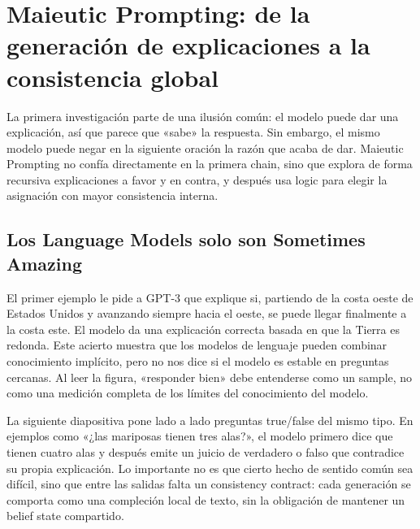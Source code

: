 \section{Maieutic Prompting: de la generación de explicaciones a la consistencia global}

La primera investigación parte de una ilusión común: el modelo puede dar una explicación, así que parece que «sabe» la respuesta. Sin embargo, el mismo modelo puede negar en la siguiente oración la razón que acaba de dar. Maieutic Prompting no confía directamente en la primera chain, sino que explora de forma recursiva explicaciones a favor y en contra, y después usa logic para elegir la asignación con mayor consistencia interna.

\subsection{Los Language Models solo son Sometimes Amazing}

El primer ejemplo le pide a GPT-3 que explique si, partiendo de la costa oeste de Estados Unidos y avanzando siempre hacia el oeste, se puede llegar finalmente a la costa este. El modelo da una explicación correcta basada en que la Tierra es redonda. Este acierto muestra que los modelos de lenguaje pueden combinar conocimiento implícito, pero no nos dice si el modelo es estable en preguntas cercanas. Al leer la figura, «responder bien» debe entenderse como un sample, no como una medición completa de los límites del conocimiento del modelo.


La siguiente diapositiva pone lado a lado preguntas true/false del mismo tipo. En ejemplos como «¿las mariposas tienen tres alas?», el modelo primero dice que tienen cuatro alas y después emite un juicio de verdadero o falso que contradice su propia explicación. Lo importante no es que cierto hecho de sentido común sea difícil, sino que entre las salidas falta un consistency contract: cada generación se comporta como una compleción local de texto, sin la obligación de mantener un belief state compartido.


